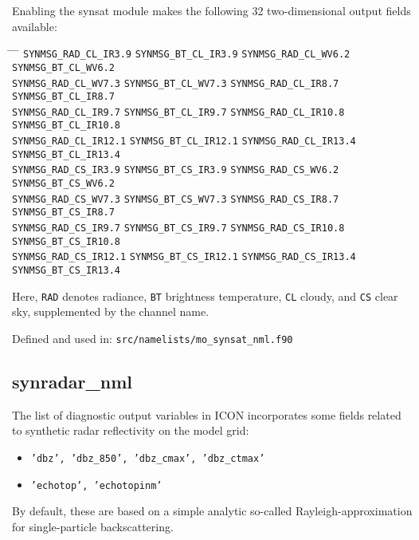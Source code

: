 Enabling the synsat module makes the following 32 two-dimensional output fields available:
%
{\renewcommand{\baselinestretch}{1.25}\normalsize%
\begin{tabbing}
\hspace*{14em} \= \hspace*{14em} \= \hspace*{14em} \= \hspace*{14em} \kill
\verb+SYNMSG_RAD_CL_IR3.9+   \>  \verb+SYNMSG_BT_CL_IR3.9+    \>
\verb+SYNMSG_RAD_CL_WV6.2+   \>   \verb+SYNMSG_BT_CL_WV6.2+   \\
\verb+SYNMSG_RAD_CL_WV7.3+   \>   \verb+SYNMSG_BT_CL_WV7.3+   \>
\verb+SYNMSG_RAD_CL_IR8.7+   \>   \verb+SYNMSG_BT_CL_IR8.7+   \\
\verb+SYNMSG_RAD_CL_IR9.7+   \>   \verb+SYNMSG_BT_CL_IR9.7+   \>
\verb+SYNMSG_RAD_CL_IR10.8+  \>   \verb+SYNMSG_BT_CL_IR10.8+  \\
\verb+SYNMSG_RAD_CL_IR12.1+  \>   \verb+SYNMSG_BT_CL_IR12.1+  \>
\verb+SYNMSG_RAD_CL_IR13.4+  \>   \verb+SYNMSG_BT_CL_IR13.4+  \\
\verb+SYNMSG_RAD_CS_IR3.9+   \>   \verb+SYNMSG_BT_CS_IR3.9+   \>
\verb+SYNMSG_RAD_CS_WV6.2+   \>   \verb+SYNMSG_BT_CS_WV6.2+   \\
\verb+SYNMSG_RAD_CS_WV7.3+   \>   \verb+SYNMSG_BT_CS_WV7.3+   \>
\verb+SYNMSG_RAD_CS_IR8.7+   \>   \verb+SYNMSG_BT_CS_IR8.7+   \\
\verb+SYNMSG_RAD_CS_IR9.7+   \>   \verb+SYNMSG_BT_CS_IR9.7+   \>
\verb+SYNMSG_RAD_CS_IR10.8+  \>   \verb+SYNMSG_BT_CS_IR10.8+  \\
\verb+SYNMSG_RAD_CS_IR12.1+  \>   \verb+SYNMSG_BT_CS_IR12.1+  \>
\verb+SYNMSG_RAD_CS_IR13.4+  \>   \verb+SYNMSG_BT_CS_IR13.4+
\end{tabbing}
}
Here, 
\verb+RAD+ denotes radiance, 
\verb+BT+ brightness temperature,
\verb+CL+ cloudy, and
\verb+CS+ clear sky, 
supplemented by the channel name.

Defined and used in: \verb+src/namelists/mo_synsat_nml.f90+

\subsection[synradar\_nml]{synradar\_nml}%

  The list of diagnostic output variables in ICON incorporates some fields related
  to synthetic radar reflectivity on the model grid:
  \begin{itemize}
    \item \texttt{'dbz', 'dbz\_850', 'dbz\_cmax', 'dbz\_ctmax'}
    \item \texttt{'echotop', 'echotopinm'}
  \end{itemize}
  By default, these are based on
  a simple analytic so-called Rayleigh-approximation for single-particle backscattering.

